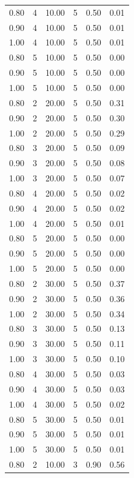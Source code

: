 \documentclass[12pt]{article}
\begin{document}
{{{{\begin{longtable}{cccccc}
  0.80 &   4 & 10.00 &   5 & 0.50 & 0.01 \\ 
  0.90 &   4 & 10.00 &   5 & 0.50 & 0.01 \\ 
  1.00 &   4 & 10.00 &   5 & 0.50 & 0.01 \\ 
  0.80 &   5 & 10.00 &   5 & 0.50 & 0.00 \\ 
  0.90 &   5 & 10.00 &   5 & 0.50 & 0.00 \\ 
  1.00 &   5 & 10.00 &   5 & 0.50 & 0.00 \\ 
  0.80 &   2 & 20.00 &   5 & 0.50 & 0.31 \\ 
  0.90 &   2 & 20.00 &   5 & 0.50 & 0.30 \\ 
  1.00 &   2 & 20.00 &   5 & 0.50 & 0.29 \\ 
  0.80 &   3 & 20.00 &   5 & 0.50 & 0.09 \\ 
  0.90 &   3 & 20.00 &   5 & 0.50 & 0.08 \\ 
  1.00 &   3 & 20.00 &   5 & 0.50 & 0.07 \\ 
  0.80 &   4 & 20.00 &   5 & 0.50 & 0.02 \\ 
  0.90 &   4 & 20.00 &   5 & 0.50 & 0.02 \\ 
  1.00 &   4 & 20.00 &   5 & 0.50 & 0.01 \\ 
  0.80 &   5 & 20.00 &   5 & 0.50 & 0.00 \\ 
  0.90 &   5 & 20.00 &   5 & 0.50 & 0.00 \\ 
  1.00 &   5 & 20.00 &   5 & 0.50 & 0.00 \\ 
  0.80 &   2 & 30.00 &   5 & 0.50 & 0.37 \\ 
  0.90 &   2 & 30.00 &   5 & 0.50 & 0.36 \\ 
  1.00 &   2 & 30.00 &   5 & 0.50 & 0.34 \\ 
  0.80 &   3 & 30.00 &   5 & 0.50 & 0.13 \\ 
  0.90 &   3 & 30.00 &   5 & 0.50 & 0.11 \\ 
  1.00 &   3 & 30.00 &   5 & 0.50 & 0.10 \\ 
  0.80 &   4 & 30.00 &   5 & 0.50 & 0.03 \\ 
  0.90 &   4 & 30.00 &   5 & 0.50 & 0.03 \\ 
  1.00 &   4 & 30.00 &   5 & 0.50 & 0.02 \\ 
  0.80 &   5 & 30.00 &   5 & 0.50 & 0.01 \\ 
  0.90 &   5 & 30.00 &   5 & 0.50 & 0.01 \\ 
  1.00 &   5 & 30.00 &   5 & 0.50 & 0.01 \\ 
  0.80 &   2 & 10.00 &   3 & 0.90 & 0.56 \\ 

\end{longtable}}}}}
\end{document}
